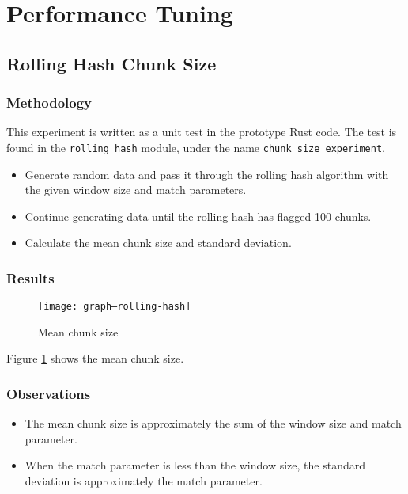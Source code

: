 \documentclass[a4paper]{article}
\begin{document}
\fi


\section{Performance Tuning}


\subsection{Rolling Hash Chunk Size}

\subsubsection{Methodology}

This experiment is written as a unit test in the prototype Rust code. The test
is found in the \texttt{rolling\_hash} module, under the name
\texttt{chunk\_size\_experiment}.

\begin{itemize}

  \item Generate random data and pass it through the rolling hash algorithm with
    the given window size and match parameters.

  \item Continue generating data until the rolling hash has flagged 100 chunks.

  \item Calculate the mean chunk size and standard deviation.

\end{itemize}

\subsubsection{Results}

\begin{figure}[p]
  \caption{Mean chunk size}
  \label{fig:graph--rolling-hash}
  \centering
    \texttt{[image: graph--rolling-hash]}
\end{figure}

Figure \ref{fig:graph--rolling-hash} shows the mean chunk size.

\subsubsection{Observations}

\begin{itemize}

  \item The mean chunk size is approximately the sum of the window size and
    match parameter.

  \item When the match parameter is less than the window size, the standard
    deviation is approximately the match parameter.

\end{itemize}
\end{document}
